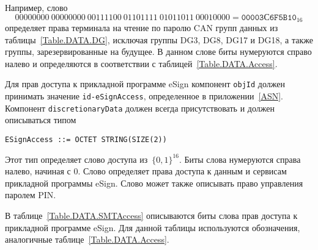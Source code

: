 Например, слово 
$$
00000000\ 00000000\ 00111100\ 01101111\ 01011011\ 00010000 = \texttt{00003С6F5B10}_{16}
$$ 
определяет права терминала на чтение по паролю CAN 
групп данных из таблицы~\ref{Table.DATA.DG}, исключая группы DG3, DG8, DG17 и DG18,
а также группы, зарезервированные на будущее.
В данном слове биты нумеруются справо налево и определяются в соответствии
с таблицей~\ref{Table.DATA.Access}.

Для прав доступа к прикладной программе eSign компонент \verb|objId| должен принимать 
значение \verb|id-eSignAccess|, определенное в приложении~\ref{ASN}. Компонент 
\verb|discretionaryData| должен всегда присутствовать и должен описываться типом  


\begin{verbatim}
ESignAccess ::= OCTET STRING(SIZE(2))
\end{verbatim}

Этот тип определяет слово доступа из~$\{0,1\}^{16}$. 
Биты слова нумеруются справа налево, начиная с 0. 
Слово определяет права доступа к данным и сервисам прикладной программы eSign.
Слово может также описывать право управления паролем PIN. 

В таблице~\ref{Table.DATA.SMTAccess} описываются биты слова прав доступа
к прикладной программе eSign. Для данной таблицы используются обозначения,
аналогичные таблице~\ref{Table.DATA.Access}.

